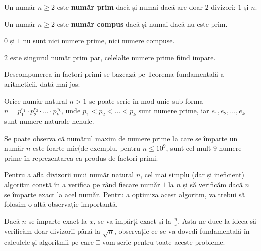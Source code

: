 \begin{definition}
    Un număr $n \geq 2$ este \textbf{număr prim} dacă și numai dacă are doar $2$ divizori: $1$ și $n$.
\end{definition}
\begin{definition}
     Un număr $n \geq 2$ este \textbf{număr compus} dacă și numai dacă nu este prim.
\end{definition}
\begin{observation}
    $0$ și $1$ nu sunt nici numere prime, nici numere compuse.
\end{observation}
\begin{observation}
    $2$ este singurul număr prim par, celelalte numere prime fiind impare.
\end{observation}

\begin{definition}
    Descompunerea în factori primi se bazează pe Teorema fundamentală a aritmeticii, dată mai jos:
\end{definition}

\begin{theorem}
Orice număr natural $n > 1$ se poate scrie în mod unic sub forma $n = p_1^{e_1} \cdot p_2^{e_2} \cdot \dots \cdot p_k^{e_k}$, unde $p_1 < p_2 < \dots < p_k$ sunt numere prime, iar $e_1, e_2, \dots, e_k$ sunt numere naturale nenule.
\end{theorem}

\begin{observation}
    Se poate observa că numărul maxim de numere prime la care se împarte un număr $n$ este foarte mic(de exemplu, pentru $n \leq 10^{9}$, sunt cel mult $9$ numere prime în reprezentarea ca produs de factori primi.
\end{observation}

Pentru a afla divizorii unui număr natural $n$, cel mai simplu (dar și ineficient) algoritm constă în a verifica pe rând fiecare număr $1$ la $n$ și să verificăm dacă $n$ se împarte exact la acel număr. Pentru a optimiza acest algoritm, va trebui să folosim o altă observație importantă.

\begin{observation}
    Dacă $n$ se împarte exact la $x$, se va împărți exact și la $\frac{n}{x}$. Asta ne duce la ideea să verificăm doar divizorii până la $\sqrt{n}$, observație ce se va dovedi fundamentală în calculele și algoritmii pe care îî vom scrie pentru toate aceste probleme. 
\end{observation}

